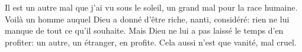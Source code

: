 Il est un autre mal que j’ai vu sous le soleil,
	un grand mal pour la race humaine.
Voilà un homme auquel Dieu a donné d’être riche, nanti, considéré:
	rien ne lui manque de tout ce qu’il souhaite.
Mais Dieu ne lui a pas laissé le temps d’en profiter:
	un autre, un étranger, en profite.
	Cela aussi n’est que vanité, mal cruel.

